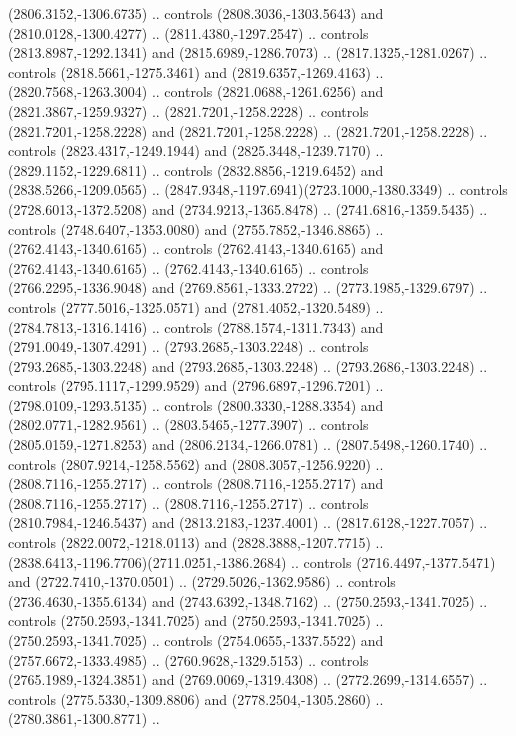 \begin{scope}[shift={(28.3138,-376.6591)}]
\begin{scope}[shift={(-2186.6262,1813.8454)}]
      (2806.3152,-1306.6735) .. controls (2808.3036,-1303.5643) and
      (2810.0128,-1300.4277) .. (2811.4380,-1297.2547) .. controls
      (2813.8987,-1292.1341) and (2815.6989,-1286.7073) .. (2817.1325,-1281.0267) ..
      controls (2818.5661,-1275.3461) and (2819.6357,-1269.4163) ..
      (2820.7568,-1263.3004) .. controls (2821.0688,-1261.6256) and
      (2821.3867,-1259.9327) .. (2821.7201,-1258.2228) .. controls
      (2821.7201,-1258.2228) and (2821.7201,-1258.2228) .. (2821.7201,-1258.2228) ..
      controls (2823.4317,-1249.1944) and (2825.3448,-1239.7170) ..
      (2829.1152,-1229.6811) .. controls (2832.8856,-1219.6452) and
      (2838.5266,-1209.0565) .. (2847.9348,-1197.6941)(2723.1000,-1380.3349) ..
      controls (2728.6013,-1372.5208) and (2734.9213,-1365.8478) ..
      (2741.6816,-1359.5435) .. controls (2748.6407,-1353.0080) and
      (2755.7852,-1346.8865) .. (2762.4143,-1340.6165) .. controls
      (2762.4143,-1340.6165) and (2762.4143,-1340.6165) .. (2762.4143,-1340.6165) ..
      controls (2766.2295,-1336.9048) and (2769.8561,-1333.2722) ..
      (2773.1985,-1329.6797) .. controls (2777.5016,-1325.0571) and
      (2781.4052,-1320.5489) .. (2784.7813,-1316.1416) .. controls
      (2788.1574,-1311.7343) and (2791.0049,-1307.4291) .. (2793.2685,-1303.2248) ..
      controls (2793.2685,-1303.2248) and (2793.2685,-1303.2248) ..
      (2793.2686,-1303.2248) .. controls (2795.1117,-1299.9529) and
      (2796.6897,-1296.7201) .. (2798.0109,-1293.5135) .. controls
      (2800.3330,-1288.3354) and (2802.0771,-1282.9561) .. (2803.5465,-1277.3907) ..
      controls (2805.0159,-1271.8253) and (2806.2134,-1266.0781) ..
      (2807.5498,-1260.1740) .. controls (2807.9214,-1258.5562) and
      (2808.3057,-1256.9220) .. (2808.7116,-1255.2717) .. controls
      (2808.7116,-1255.2717) and (2808.7116,-1255.2717) .. (2808.7116,-1255.2717) ..
      controls (2810.7984,-1246.5437) and (2813.2183,-1237.4001) ..
      (2817.6128,-1227.7057) .. controls (2822.0072,-1218.0113) and
      (2828.3888,-1207.7715) .. (2838.6413,-1196.7706)(2711.0251,-1386.2684) ..
      controls (2716.4497,-1377.5471) and (2722.7410,-1370.0501) ..
      (2729.5026,-1362.9586) .. controls (2736.4630,-1355.6134) and
      (2743.6392,-1348.7162) .. (2750.2593,-1341.7025) .. controls
      (2750.2593,-1341.7025) and (2750.2593,-1341.7025) .. (2750.2593,-1341.7025) ..
      controls (2754.0655,-1337.5522) and (2757.6672,-1333.4985) ..
      (2760.9628,-1329.5153) .. controls (2765.1989,-1324.3851) and
      (2769.0069,-1319.4308) .. (2772.2699,-1314.6557) .. controls
      (2775.5330,-1309.8806) and (2778.2504,-1305.2860) .. (2780.3861,-1300.8771) ..

\end{scope}
\end{scope}
